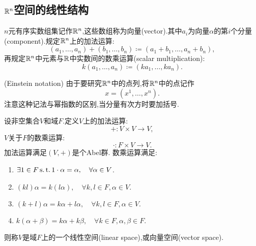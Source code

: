 \subsection{$\R^n$空间的线性结构}

\begin{definition}[有限维实空间$\R^n$]
    $n$元有序实数组集记作$\R^n$,这些数组称为向量(vector).其中$a_i$为向量$\alpha$的第$i$个分量(component).规定$\R^n$上的加法运算:
    \[(a_1,\ldots,a_n)+(b_1,\ldots,b_n)\coloneq (a_1+b_1,\ldots,a_n+b_n),\]
    再规定$\R^n$中元素与$\mathbb{R}$中实数间的数乘运算(scalar multiplication):
    \[k(a_1,\ldots,a_n)\coloneq (ka_1,\ldots,ka_n).\]
\end{definition}

\begin{remark}(Einstein notation)
    由于要研究$\R^n$中的点列,将$\R^n$中的点记作
    \[x=(x^1,\ldots,x^n).\]
    注意这种记法与幂指数的区别,当分量有次方时要加括号.
\end{remark}

\begin{proposition}[$\R^n$的线性性质]%

\end{proposition}

\begin{axiom}[线性空间]%
    设非空集合$V$和域$F$.定义$V$上的加法运算:
    \[+:V\times V\to V,\]
    $V$关于$F$的数乘运算:
    \[\cdot :F\times V\to V.\]
    加法运算满足$(V,+)$是个Abel群.
    数乘运算满足:
    \begin{enumerate}
        \item $\exists 1\in F\operatorname{s.t.} 1 \cdot\alpha=\alpha,\quad\forall\alpha\in V$.
        \item $(kl)\alpha=k(l\alpha),\quad\forall k,l\in F,\alpha\in V$.
        \item $(k+l)\alpha=k\alpha+l\alpha,\quad\forall k,l\in F,\alpha\in V.$
        \item $k(\alpha+\beta)=k\alpha+k\beta,\quad\forall k\in F,\alpha,\beta\in F.$
    \end{enumerate}
    则称$V$是域$F$上的一个线性空间(linear space),或向量空间(vector space).
\end{axiom}

\begin{definition}[线性相关性]%
    
\end{definition}

\begin{definition}[$\R^n$的基]%
    
\end{definition}